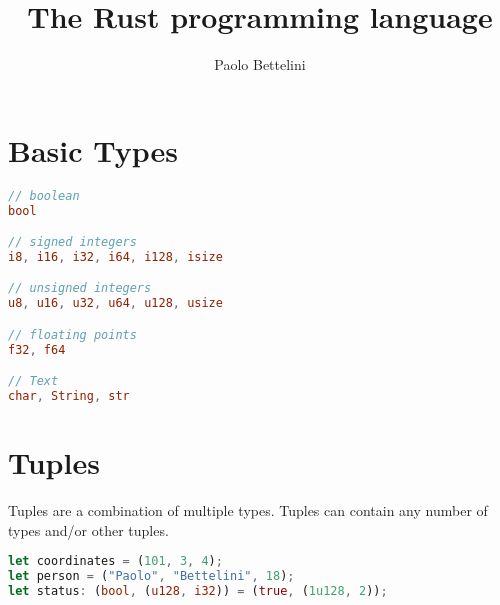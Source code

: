 \documentclass{article}
\title{The Rust programming language}
\author{Paolo Bettelini}
\date{}
\begin{document}
\maketitle
\tableofcontents
\pagebreak

\section{Basic Types}


\begin{lstlisting}[language=Rust, style=boxed, numbers=none]
// boolean
bool

// signed integers
i8, i16, i32, i64, i128, isize

// unsigned integers
u8, u16, u32, u64, u128, usize

// floating points
f32, f64

// Text
char, String, str
\end{lstlisting}

\section{Tuples}

Tuples are a combination of multiple types.
Tuples can contain any number of types and/or other tuples.

\begin{lstlisting}[language=Rust, style=boxed, numbers=none]
let coordinates = (101, 3, 4);
let person = ("Paolo", "Bettelini", 18);
let status: (bool, (u128, i32)) = (true, (1u128, 2));
\end{lstlisting}
\end{document}
